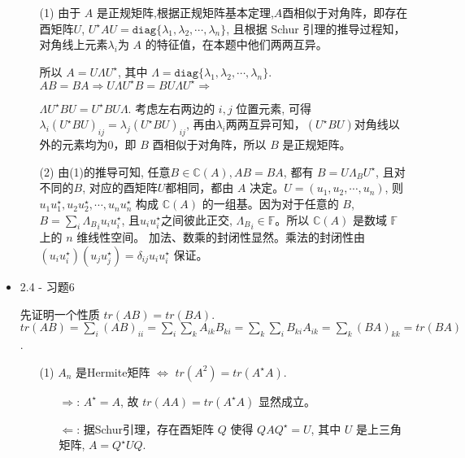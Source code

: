 \documentclass{article}
\begin{document}
\begin{spacing}{1.5}
\begin{itemize}
    \begin{itemize}
        \item [(1)]由于 $A$ 是正规矩阵,根据正规矩阵基本定理,$A$酉相似于对角阵，即存在酉矩阵$U$, $U^\star A U = \mathtt{diag}\{\lambda_1, \lambda_2, \cdots, \lambda_n\}$, 且根据 Schur 引理的推导过程知，对角线上元素$\lambda_i$为 $A$ 的特征值，在本题中他们两两互异。

            所以 $A = U\Lambda U^\star$, 其中 $\Lambda = \mathtt{diag}\{\lambda_1, \lambda_2, \cdots, \lambda_n\}$. $AB=BA \Rightarrow U\Lambda U^\star B = B U\Lambda U^\star \Rightarrow$ 
            
            $\Lambda U^\star B U = U^\star B U \Lambda$. 考虑左右两边的 $i,j$ 位置元素, 可得 $\lambda_i (U^\star B U)_{ij} = \lambda_j (U^\star B U)_{ij}$, 再由$\lambda_i$两两互异可知，$(U^\star B U)$对角线以外的元素均为0，即 $B$ 酉相似于对角阵，所以 $B$ 是正规矩阵。
        \item[(2)] 由(1)的推导可知, 任意$B\in\mathbb{C}(A), AB=BA$, 都有 $B = U\Lambda_B U^\star$, 且对不同的$B$, 对应的酉矩阵$U$都相同，都由 $A$ 决定。$U = (u_1, u_2, \cdots, u_n)$, 则 $u_1u_1^\star, u_2u_2^\star,\cdots, u_nu_n^\star$ 构成 $\mathbb{C}(A)$
        的一组基。因为对于任意的 $B$, $B= \sum_i {\Lambda_B}_i u_iu_i^\star$, 且$u_iu_i^\star$之间彼此正交, ${\Lambda_B}_{i}\in\mathbb{F}$。所以 $\mathbb{C}(A)$ 是数域 $\mathbb{F}$ 上的 $n$ 维线性空间。
        加法、数乘的封闭性显然。乘法的封闭性由 $(u_iu_i^\star)(u_ju_j^\star) = \delta_{ij} u_iu_i^\star$ 保证。
        
    \end{itemize}
    
    

    \item 2.4 - 习题6
    
    先证明一个性质 $tr(AB) = tr(BA)$. $tr(AB) = \sum_{i} (AB)_{ii} = \sum_{i} \sum_{k} A_{ik}B_{ki} = \sum_{k}\sum_{i} B_{ki}A_{ik} = \sum_k (BA)_{kk} = tr(BA)$.

    \begin{itemize}
        \item [(1)] $A_n$ 是Hermite矩阵 $\Leftrightarrow$ $tr(A^2) = tr(A^\star A)$.
        \begin{itemize}
            \item [$\Rightarrow$:] $A^\star = A$, 故 $tr(AA) = tr(A^\star A)$ 显然成立。
            \item [$\Leftarrow$:] 据Schur引理，存在酉矩阵 $Q$ 使得 $QAQ^\star = U$, 其中 $U$ 是上三角矩阵, $A = Q^\star U Q$.
            

\end{itemize}
\end{itemize}
\end{itemize}
\end{spacing}
\end{document}
